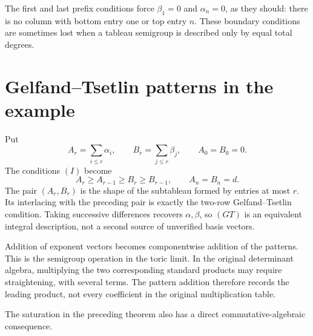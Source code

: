 The first and last prefix
conditions force
\(\beta_1=0\) and
\(\alpha_n=0\), as
they should: there is
no column with bottom
entry one or top
entry \(n\).  These
boundary conditions
are sometimes lost
when a tableau
semigroup is described
only by equal total
degrees.

\section{Gelfand--Tsetlin patterns in the example}

Put
\[
 A_r=\sum_{i\le r}\alpha_i,\qquad
 B_r=\sum_{j\le r}\beta_j,\qquad
 A_0=B_0=0.
\]
The conditions \((I)\) become
\[
 A_r\ge A_{r-1}\ge B_r\ge B_{r-1},
 \qquad A_n=B_n=d.
 \tag{GT}
\]
The pair \((A_r,B_r)\)
is the shape of the
subtableau formed by
entries at most \(r\).
Its interlacing with
the preceding pair
is exactly the
two-row Gelfand--Tsetlin
condition.  Taking
successive differences
recovers \(\alpha,\beta\),
so \((GT)\) is an
equivalent integral
description, not a
second source of
unverified basis
vectors.

Addition of exponent
vectors becomes
componentwise addition
of the patterns.
This is the semigroup
operation in the
toric limit.  In the
original determinant
algebra, multiplying
the two corresponding
standard products
may require
straightening, with
several terms.  The
pattern addition
therefore records
the leading product,
not every coefficient
in the original
multiplication table.

The saturation in the
preceding theorem also
has a direct
commutative-algebraic
consequence.

